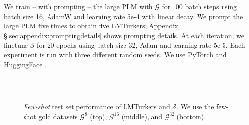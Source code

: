 \documentclass[11pt]{article}
\def\mdrs{LMTurkers\xspace}
\def\figlabel#1{\label{fig:#1}\label{p:#1}}
\def\secref#1{\S\ref{sec:#1}}
\begin{document}
We train -- with prompting --
the large PLM with $\mathcal{G}$
for 100 batch steps using  batch size 16,
AdamW \citep{adamw} and 
learning rate
5e-4 with linear decay.
We prompt the large PLM five times
to obtain five \mdrs;
Appendix \secref{appendix:promptingdetails}
shows
prompting details.
At each iteration,
we finetune  $\mathcal{S}$
for 20 epochs using  batch size 32,
Adam \citep{adampaper} and 
learning rate
5e-5.
Each experiment is run
with three different random seeds.
We use PyTorch \citep{torch} and  HuggingFace
\citep{wolf-etal-2020-transformers}.



 


\begin{figure}[t]
  \centering
	\\
       \\
\caption{
\emph{Few-shot} test set performance of
\mdrs and $\mathcal{S}$.
We use the few-shot gold datasets
$\mathcal{G}^8$ (top),
$\mathcal{G}^{16}$ (middle),
and $\mathcal{G}^{32}$ (bottom).}
\figlabel{fewshotperf}
\end{figure}
\end{document}
